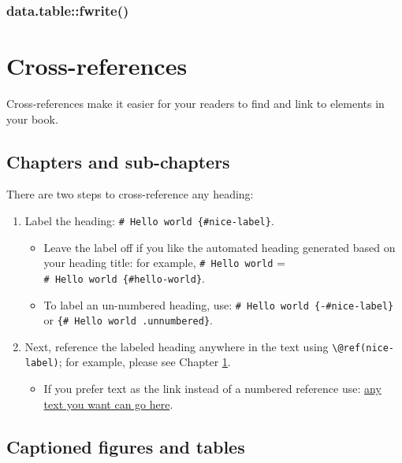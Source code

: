\documentclass[
]{book}
\providecommand{\tightlist}{%
  \setlength{\itemsep}{0pt}\setlength{\parskip}{0pt}}
\theoremstyle{definition}
\theoremstyle{definition}
\theoremstyle{definition}
\theoremstyle{definition}
\theoremstyle{remark}
\begin{document}
\hypertarget{data.tablefwrite}{%
\subsection{data.table::fwrite()}\label{data.tablefwrite}}

\hypertarget{cross}{%
\chapter{Cross-references}\label{cross}}

Cross-references make it easier for your readers to find and link to elements in your book.

\hypertarget{chapters-and-sub-chapters}{%
\section{Chapters and sub-chapters}\label{chapters-and-sub-chapters}}

There are two steps to cross-reference any heading:

\begin{enumerate}
\def\labelenumi{\arabic{enumi}.}
\tightlist
\item
  Label the heading: \texttt{\#\ Hello\ world\ \{\#nice-label\}}.

  \begin{itemize}
  \tightlist
  \item
    Leave the label off if you like the automated heading generated based on your heading title: for example, \texttt{\#\ Hello\ world} = \texttt{\#\ Hello\ world\ \{\#hello-world\}}.
  \item
    To label an un-numbered heading, use: \texttt{\#\ Hello\ world\ \{-\#nice-label\}} or \texttt{\{\#\ Hello\ world\ .unnumbered\}}.
  \end{itemize}
\item
  Next, reference the labeled heading anywhere in the text using \texttt{\textbackslash{}@ref(nice-label)}; for example, please see Chapter \ref{cross}.

  \begin{itemize}
  \tightlist
  \item
    If you prefer text as the link instead of a numbered reference use: \protect\hyperlink{cross}{any text you want can go here}.
  \end{itemize}
\end{enumerate}

\hypertarget{captioned-figures-and-tables}{%
\section{Captioned figures and tables}\label{captioned-figures-and-tables}}
\end{document}
